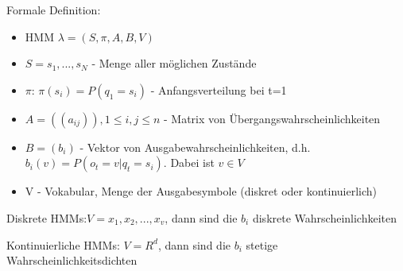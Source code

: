 \documentclass[a4paper,10pt,oneside]{article}
\begin{document}
Formale Definition:
	\begin{itemize}
		\item HMM $\lambda = (S,\pi, A,B,V)$
		\item $S={s_1,...,s_N}$ - Menge aller möglichen Zustände
		\item $\pi$: $\pi(s_i) = P(q_1 = s_i)$ - Anfangsverteilung bei t=1
		\item $A=((a_{ij})), 1 \leq i, j \leq n$ - Matrix von Übergangswahrscheinlichkeiten
		\item $B=(b_i)$ - Vektor von Ausgabewahrscheinlichkeiten, d.h. $b_i(v)=P(o_t = v | q_t = s_i)$. Dabei ist $v \in V$
		\item V - Vokabular, Menge der Ausgabesymbole (diskret oder kontinuierlich)
	\end{itemize}

Diskrete HMMs:$V = {x_1,x_2, ...,x_v}$, dann sind die $b_i$ diskrete Wahrscheinlichkeiten


Kontinuierliche HMMs: $V=R^d$, dann sind die $b_i$ stetige Wahrscheinlichkeitsdichten
\end{document}
